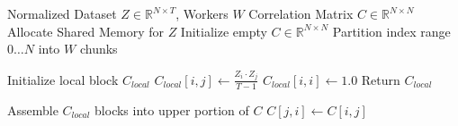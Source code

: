 \begin{minipage}{0.95\textwidth}
    \begin{algorithm}[H]
        \caption{Optimized Multiprocessing CPU Engine (Symmetry Aware)}
        \label{alg:optimized_cpu}
        \begin{algorithmic}[1]
        \Require Normalized Dataset $Z \in \mathbb{R}^{N \times T}$, Workers $W$
        \Ensure Correlation Matrix $C \in \mathbb{R}^{N \times N}$
            \State Allocate Shared Memory for $Z$
            \State Initialize empty $C \in \mathbb{R}^{N \times N}$
            \State Partition index range $0 \dots N$ into $W$ chunks
            
                \State Initialize local block $C_{local}$
                     
                        \State $C_{local}[i, j] \gets \frac{Z_i \cdot Z_j}{T-1}$ 
                    \EndFor
                    \State $C_{local}[i, i] \gets 1.0$ 
                \EndFor
                \State Return $C_{local}$
            \EndFor
            
            \State Assemble $C_{local}$ blocks into upper portion of $C$
             
                \State $C[j, i] \gets C[i, j]$ 
            \EndFor
        \end{algorithmic}
    \end{algorithm}
\end{minipage}

\vspace{0.5cm}

